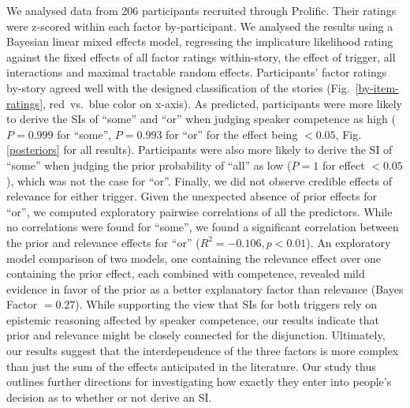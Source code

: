 \documentclass[11pt,letterpaper]{article}
\begin{document}
We analysed data from 206 participants recruited through Prolific. Their ratings were z-scored within each factor by-participant. We analysed the results using a Bayesian linear mixed effects model, regressing the implicature likelihood rating against the fixed effects of all factor ratings within-story, the effect of trigger, all interactions and maximal tractable random effects. Participants' factor ratings by-story agreed well with the designed classification of the stories (Fig.~\ref{by-item-ratings}, red~vs.~blue color on x-axis).
As predicted, participants were more likely to derive the SIs of ``some'' and ``or'' when judging speaker competence as high ($P=0.999$ for ``some'',  $P=0.993$ for ``or'' for the effect being $<0.05$, Fig.\ref{posteriors} for all results). 
Participants were also more likely to derive the SI of ``some'' when judging the prior probability of ``all'' as low ($P =  1$ for effect $<0.05$), which was not the case for ``or''. %
Finally, we did not observe credible effects of relevance for either trigger.
Given the unexpected absence of prior effects for ``or'', we computed exploratory pairwise correlations of all the predictors. While no correlations were found for ``some'', we found a significant correlation between the prior and relevance effects for ``or'' ($R^2 = -0.106, p<0.01$). %
An exploratory model comparison of two models, one containing the relevance effect over one containing the prior effect, each combined with competence, revealed mild evidence in favor of the prior as a better explanatory factor than relevance (Bayes Factor $ = 0.27$). %
While supporting the view that SIs for both triggers rely on epistemic reasoning affected by speaker competence, our results indicate that prior and relevance might be closely connected for the disjunction.
Ultimately, our results suggest that the interdependence of the three factors is more complex than just the sum of the effects anticipated in the literature. 
Our study thus outlines further directions for investigating how exactly they enter into people’s decision as to whether or not derive an SI.
\end{document}
